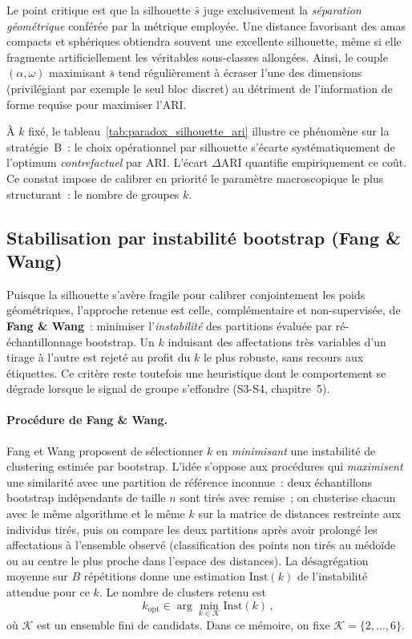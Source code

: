 \documentclass[11pt,a4paper]{article}
\begin{document}


Le point critique est que la silhouette $\bar{s}$ juge exclusivement la \emph{séparation géométrique} conférée par la métrique employée. Une distance favorisant des amas compacts et sphériques obtiendra souvent une excellente silhouette, même si elle fragmente artificiellement les véritables sous-classes allongées. Ainsi, le couple $(\alpha,\omega)$ maximisant $\bar{s}$ tend régulièrement à écraser l'une des dimensions (privilégiant par exemple le seul bloc discret) au détriment de l'information de forme requise pour maximiser l'ARI.

\medskip
\noindent
À $k$ fixé, le tableau~\ref{tab:paradox_silhouette_ari} illustre ce phénomène sur la stratégie~B~: le choix opérationnel par silhouette s'écarte systématiquement de l'optimum \emph{contrefactuel} par ARI. L'écart $\Delta\mathrm{ARI}$ quantifie empiriquement ce coût. Ce constat impose de calibrer en priorité le paramètre macroscopique le plus structurant~: le nombre de groupes $k$.

\subsection{Stabilisation par instabilité bootstrap (Fang \& Wang)}
\label{sec:fang_wang}

Puisque la silhouette s'avère fragile pour calibrer conjointement les poids géométriques, l'approche retenue est celle, complémentaire et non-supervisée, de \textbf{Fang \& Wang}~: minimiser l'\emph{instabilité} des partitions évaluée par ré-échantillonnage bootstrap. Un $k$ induisant des affectations très variables d'un tirage à l'autre est rejeté au profit du $k$ le plus robuste, sans recours aux étiquettes. Ce critère reste toutefois une heuristique dont le comportement se dégrade lorsque le signal de groupe s'effondre (S3-S4, chapitre~5).

\paragraph{Procédure de Fang \& Wang.}
Fang et Wang proposent de sélectionner $k$ en \emph{minimisant} une instabilité
de clustering estimée par bootstrap. L'idée s'oppose aux procédures qui
\emph{maximisent} une similarité avec une partition de référence inconnue~: deux
échantillons bootstrap indépendants de taille $n$ sont tirés avec remise~; on
clusterise chacun avec le même algorithme et le même $k$ sur la matrice de
distances restreinte aux individus tirés, puis on compare les deux partitions
après avoir prolongé les affectations à l'ensemble observé (classification des
points non tirés au médoïde ou au centre le plus proche dans l'espace des
distances). La désagrégation moyenne sur $B$ répétitions donne une estimation
$\mathrm{Inst}(k)$ de l'instabilité attendue pour ce $k$. Le nombre de
clusters retenu est
\begin{equation}
  k_{\mathrm{opt}} \in \arg\min_{k\in\mathcal{K}} \mathrm{Inst}(k)\,,
\end{equation}
où $\mathcal{K}$ est un ensemble fini de candidats. Dans ce mémoire, on fixe $\mathcal{K}=\{2,\ldots,6\}$.
\end{document}
